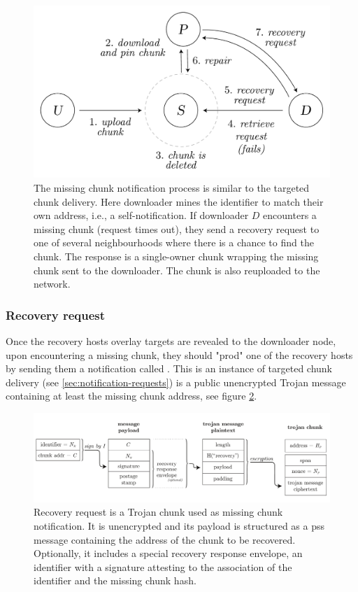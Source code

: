 \begin{figure}[htbp]
\centering
\includegraphics[width=.8\textwidth]{fig/missing-chunk-notification.pdf} \caption[Missing chunk notification process \statusgreen]{The missing chunk notification process is similar to the targeted chunk delivery. Here downloader mines the identifier to match their own address, i.e., a self-notification. If downloader $D$ encounters a missing chunk (request times out), they send a recovery request to one of several neighbourhoods where there is a chance to find the chunk. The response is a single-owner chunk wrapping the missing chunk sent to the downloader. The chunk is also reuploaded to the network.}
\label{fig:missing-chunk-notification}
\end{figure}

\subsubsection{Recovery request}

Once the recovery hosts overlay targets are revealed to the downloader node, upon encountering a missing chunk, they should "prod" one of the recovery hosts by sending them a notification called . This is an instance of targeted chunk delivery (see \ref{sec:notification-requests})  is a public unencrypted Trojan message containing at least the missing chunk address, see figure \ref{fig:recovery-request}.

\begin{figure}[htbp]
  \centering
  \includegraphics[width=\textwidth]{fig/recovery-request.pdf}
  \caption[Recovery request \statusgreen]{Recovery request is a Trojan chunk used as missing chunk notification. It is unencrypted and its payload is structured as a pss message containing the address of the chunk to be recovered. Optionally, it includes a special recovery response envelope, an identifier with a signature attesting to the association of the identifier and the missing chunk hash.}
  \label{fig:recovery-request}
\end{figure}

